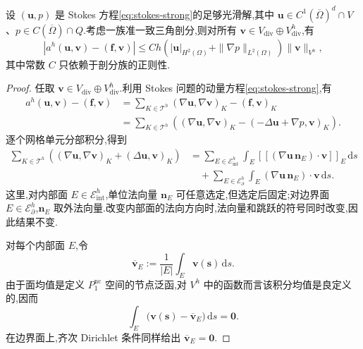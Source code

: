 \begin{lemma}[一致性误差估计]\label{lem:stokes-nonconforming-consistency}
设 $(\bm{u},p)$ 是 Stokes 方程\cref{eq:stokes-strong}的足够光滑解,其中 $\bm{u}\in C^1(\overline{\Omega})^d\cap V$、$p\in C(\overline{\Omega})\cap Q$.考虑一族准一致三角剖分,则对所有 $\bm{v}\in V_{\mathrm{div}}\oplus V_{\mathrm{div}}^h$,有
\begin{equation}\label{eq:stokes-nonconforming-consistency}
  \left|a^h(\bm{u},\bm{v})-(\bm{f},\bm{v})\right|
  \leq Ch\left(
      |\bm{u}|_{H^2(\Omega)}
      +\|\nabla p\|_{L^2(\Omega)}
    \right)\|\bm{v}\|_{V^h},
\end{equation}
其中常数 $C$ 只依赖于剖分族的正则性.
\end{lemma}
\begin{proof}
任取 $\bm{v}\in V_{\mathrm{div}}\oplus V_{\mathrm{div}}^h$.利用 Stokes 问题的动量方程\cref{eq:stokes-strong},有
\begin{equation}\label{eq:stokes-nonconforming-consistency-momentum}
\begin{aligned}
  a^h(\bm{u},\bm{v})-(\bm{f},\bm{v})
  &=\sum_{K\in\mathcal{T}^h}
      (\nabla\bm{u},\nabla\bm{v})_K
      -(\bm{f},\bm{v})_K\\
  &=\sum_{K\in\mathcal{T}^h}
      \left((\nabla\bm{u},\nabla\bm{v})_K
      -(-\Delta\bm{u}+\nabla p,\bm{v})_K\right).
\end{aligned}
\end{equation}
逐个网格单元分部积分,得到
\begin{equation}\label{eq:stokes-nonconforming-consistency-velocity-parts}
\begin{aligned}
  \sum_{K\in\mathcal{T}^h}
      \left((\nabla\bm{u},\nabla\bm{v})_K
            +(\Delta\bm{u},\bm{v})_K\right)
  &=\sum_{E\in\mathcal{E}_{\mathrm{int}}^h}
      \int_E\left[\!\left[
        (\nabla\bm{u}\,\bm{n}_E)\cdot\bm{v}
      \right]\!\right]_E\,\mathrm{d}s\\
  &\quad+\sum_{E\in\mathcal{E}_{\partial}^h}
      \int_E(\nabla\bm{u}\,\bm{n}_E)\cdot\bm{v}\,\mathrm{d}s.
\end{aligned}
\end{equation}
这里,对内部面 $E\in\mathcal{E}_{\mathrm{int}}^h$,单位法向量 $\bm{n}_E$ 可任意选定,但选定后固定;对边界面 $E\in\mathcal{E}_{\partial}^h$,$\bm{n}_E$ 取外法向量.改变内部面的法向方向时,法向量和跳跃的符号同时改变,因此结果不变.

对每个内部面 $E$,令
\[
  \overline{\bm{v}}_E
  :=\frac{1}{|E|}\int_E\bm{v}(\bm{s})\,\mathrm{d}s.
\]
由于面均值是定义 $P_1^{\mathrm{nc}}$ 空间的节点泛函,对 $V^h$ 中的函数而言该积分均值是良定义的,因而
\begin{equation}\label{eq:stokes-nonconforming-face-mean-zero}
  \int_E\bigl(\bm{v}(\bm{s})-\overline{\bm{v}}_E\bigr)
     \,\mathrm{d}s=\bm{0}.
\end{equation}
在边界面上,齐次 Dirichlet 条件同样给出 $\overline{\bm{v}}_E=\bm{0}$.


\end{proof}
